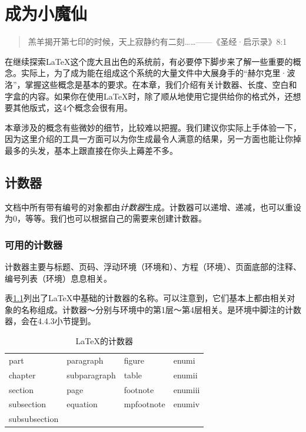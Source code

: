 \chapter{成为小魔仙}

\begin{quote}
    羔羊揭开第七印的时候，天上寂静约有二刻……——《圣经·启示录》8:1
\end{quote}

在继续探索\LaTeX 这个庞大且出色的系统前，有必要停下脚步来了解一些重要的概念。实际上，为了成为能在组成这个系统的大量文件中大展身手的“赫尔克里·波洛”，掌握这些概念是基本的要求。在本章，我们介绍有关计数器、长度、空白和字盒的内容。如果你在使用\LaTeX 时，除了顺从地使用它提供给你的格式外，还想要其他版式，这4个概念会很有用。

\begin{exclamation}
    本章涉及的概念有些微妙的细节，比较难以把握。我们建议你实际上手体验一下，因为这里介绍的工具一方面可以为你生成最令人满意的结果，另一方面也能让你掉最多的头发，基本上跟直接在你头上薅差不多。
\end{exclamation}
\section{计数器}

文档中所有带有编号的对象都由\emph{计数器}生成。计数器可以递增、递减，也可以重设为0，等等。我们也可以根据自己的需要来创建计数器。

\subsection{可用的计数器}

计数器主要与标题、页码、浮动环境（环境和）、方程（环境）、页面底部的注释、编号列表（环境）息息相关。

表\ref{tab:4.1}列出了\LaTeX 中基础的计数器的名称。可以注意到，它们基本上都由相关对象的名称组成。计数器～分别与环境中的第1层～第4层相关。是环境中脚注的计数器，会在4.4.3小节提到。

\begin{table}
  \centering
  \ttfamily
  \begin{tabular}{|l|l|l|l|}
    \hline
    part       & paragraph    & figure     & enumi\\
    chapter    & subparagraph & table      & enumii\\
    section    & page         & footnote   & enumiii\\
    subsection & equation     & mpfootnote & enumiv\\
    subsubsection &&&\\
    \hline
  \end{tabular}
  \caption{\LaTeX 的计数器}
  \label{tab:4.1}
\end{table}

